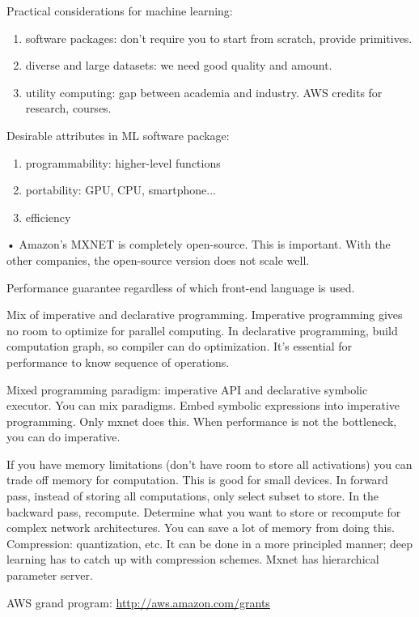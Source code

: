 Practical considerations for machine learning:
\begin{enumerate}
\item
software packages: don't require you to start from scratch, provide primitives.
\item
diverse and large datasets: we need good quality and amount.
\item
utility computing: gap between academia and industry. AWS credits for research, courses.
\end{enumerate}
%

Desirable attributes in ML software package:
\begin{enumerate}
\item
programmability: higher-level functions
\item
portability: GPU, CPU, smartphone...
\item
efficiency
\end{enumerate}•
Amazon's MXNET is completely open-source. This is important. With the other companies, the open-source version does not scale well.

Performance guarantee regardless of which front-end language is used.

Mix of imperative and declarative programming. Imperative programming gives no room to optimize for parallel computing. In declarative programming, build computation graph, so compiler can do optimization.
It's essential for performance to know sequence of operations.

Mixed programming paradigm: imperative API and declarative symbolic executor. You can mix paradigms. Embed symbolic expressions into imperative programming. Only mxnet does this.
When performance is not the bottleneck, you can do imperative.

If you have memory limitations (don't have room to store all  activations) you can trade off memory for computation. This is good for small devices. In forward pass, instead of storing all computations, only select subset to store. In the backward pass, recompute. Determine what you want to store or recompute for complex network architectures. You can save a lot of memory from doing this.
Compression: quantization, etc. It can be done in a more principled manner; deep learning has to catch up with compression schemes.
Mxnet has hierarchical parameter server.

AWS grand program: \url{http://aws.amazon.com/grants}

%
